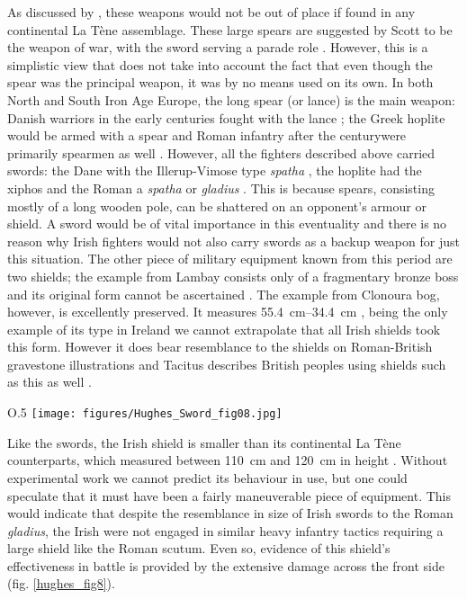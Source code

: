 As discussed by \textcite[65]{Scott1990}, these weapons would not be out of place if found in any continental La Tène assemblage. 
These large spears are suggested by Scott to be the weapon of war, with the sword serving a parade role \parencite[c.f.][45\psqq]{Lejars2007}. 
However, this is a simplistic view that does not take into account the fact that even though the spear was the principal weapon, it was by no means used on its own. 
In both North and South Iron Age Europe, the long spear (or lance) is the main weapon:
 Danish warriors in the early centuries \AD fought with the lance \parencite{Hvid2007}; the Greek hoplite would be armed with a spear \parencite[6]{Goldsworthy1997} and Roman infantry after the  century\AD were primarily spearmen as well \parencite[61]{Stephenson1999}. 
 However, all the fighters described above carried swords: the Dane with the Illerup-Vimose type \emph{spatha} \parencite[139]{Hvid2007}, 
 the hoplite had the xiphos \parencite[23]{Anderson1993} and the Roman a \emph{spatha} or \emph{gladius} \parencite[58]{Stephenson1999}. 
 This is because spears, consisting mostly of a long wooden pole, can be shattered on an opponent’s armour or shield. 
 A sword would be of vital importance in this eventuality and there is no reason why Irish fighters would not also carry swords as a backup weapon for just this situation.
The other piece of military equipment known from this period are two shields; 
the example from Lambay consists only of a fragmentary bronze boss and its original form cannot be ascertained \parencites[107]{Raftery1983}[see also][chapter 4]{CahillWilson2014}. 
The example from Clonoura bog, however, is excellently preserved. 
It measures \SIrange[range-phrase=$\times$]{55.4}{34.4}{\cm} \parencite[1007]{Raftery1983}, 
being the only example of its type in Ireland we cannot extrapolate that all Irish shields took this form. 
However it does bear resemblance to the shields on Roman-British gravestone illustrations and Tacitus describes British peoples using shields such as this as well \parencites[313]{Coulston2006}[71]{Coulston2014}. 


\begin{wrapfigure}{O}{.5\textwidth}
\texttt{[image: figures/Hughes\_Sword\_fig08.jpg]} 
\caption{Leather shield from Clonoura bog © Hughes 2015}
\label{hughes_fig8}
\end{wrapfigure}
Like the swords, the Irish shield is smaller than its continental La Tène counterparts, which measured between \SI{110}{\cm} and \SI{120}{\cm} in height \parencite[165]{Lejars2007}. 
Without experimental work we cannot predict its behaviour in use, but one could speculate that it must have been a fairly maneuverable piece of equipment. 
This would indicate that despite the resemblance in size of Irish swords to the Roman \emph{gladius}, the Irish were not engaged in similar heavy infantry tactics requiring a large shield like the Roman scutum. 
Even so, evidence of this shield’s effectiveness in battle is provided by the extensive damage across the front side (fig. \ref{hughes_fig8}).





